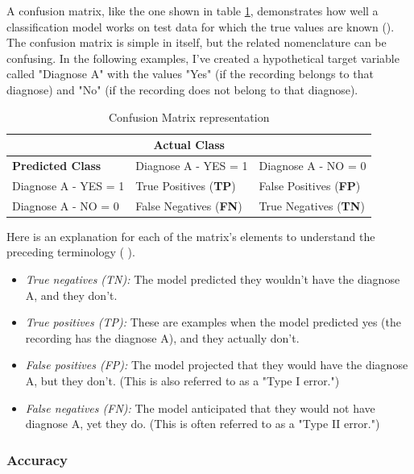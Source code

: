 A confusion matrix, like the one shown in table \ref{table:confmatr}, demonstrates how well a classification model works on test data for which the true values are known (\cite{metrics2}). The confusion matrix is simple in itself, but the related nomenclature can be confusing. In the following examples, I've created a hypothetical target variable called "Diagnose A" with the values "Yes" (if the recording belongs to that diagnose) and "No" (if the recording does not belong to that diagnose).


\begin{table}[H]
\centering
\begin{tabular}{ |p{4cm}||p{4cm}||p{4cm}|  }
 \hline
 \multicolumn{3}{|c|}{\textbf{Actual Class}} \\
 \hline
 \textbf{Predicted Class}  & Diagnose A - YES = 1 & Diagnose A - NO = 0\\
 \hline
 Diagnose A - YES = 1 & True Positives (\textbf{TP})  & False Positives (\textbf{FP}) \\
 Diagnose A - NO = 0 & False Negatives (\textbf{FN})  & True Negatives (\textbf{TN}) \\
 \hline
\end{tabular}
\caption{Confusion Matrix representation}
\label{table:confmatr}
\end{table}

Here is an explanation for each of the matrix's elements to understand the preceding terminology (\cite{metrics2} \cite{metrics1}).

\begin{itemize}
    \item \textit{True negatives (TN):} The model predicted they wouldn't have the diagnose A, and they don't.
    \item \textit{True positives (TP):} These are examples when the model predicted yes (the recording has the diagnose A), and they actually don't.
    \item \textit{False positives (FP):} The model projected that they would have the diagnose A, but they don't. (This is also referred to as a "Type I error.")
    \item \textit{False negatives (FN):} The model anticipated that they would not have diagnose A, yet they do. (This is often referred to as a "Type II error.")
\end{itemize}

\subsubsection{Accuracy} \label{4accuracy}

